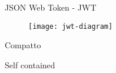 \begin{frame}[t,noframenumbering]{JSON Web Token - JWT}
\vspace{0.2cm}
\begin{figure}[h]
\centering
\texttt{[image: jwt-diagram]}
\end{figure}
\begin{center}
\hfill
\begin{minipage}{0.45\textwidth}
\begin{adv}
\item Compatto
\end{adv}
\end{minipage}
\hfill
\begin{minipage}{0.45\textwidth}
\begin{adv}
\item Self contained
\end{adv}
\end{minipage}
\end{center}
\end{frame}